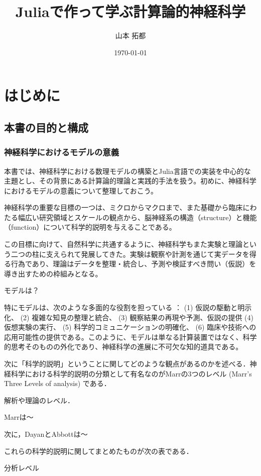 \documentclass[titlepage]{ltjsbook}
\title{\Huge \textbf{Juliaで作って学ぶ計算論的神経科学}}
\author{\huge 山本 拓都}
\date{\huge \today}
\begin{document}
\setcounter{tocdepth}{2}
\tableofcontents
\clearpage
\chapter{はじめに}
\section{本書の目的と構成}
\subsection{神経科学におけるモデルの意義}
本書では、神経科学における数理モデルの構築とJulia言語での実装を中心的な主題とし、その背景にある計算論的理論と実践的手法を扱う。初めに、神経科学におけるモデルの意義について整理しておこう。

神経科学の重要な目標の一つは、ミクロからマクロまで、また基礎から臨床にわたる幅広い研究領域とスケールの観点から、脳神経系の構造（structure）と機能（function）について科学的説明を与えることである。

この目標に向けて、自然科学に共通するように、神経科学もまた実験と理論という二つの柱に支えられて発展してきた。実験は観察や計測を通じて実データを得る行為であり、理論はデータを整理・統合し、予測や検証すべき問い（仮説）を導き出すための枠組みとなる。

モデルは？

特にモデルは、次のような多面的な役割を担っている \citep{Blohm2020-vc,levenstein2023role,van2024critical}：
 (1) 仮説の駆動と明示化、 (2) 複雑な知見の整理と統合、 (3) 観察結果の再現や予測、仮説の提供 (4) 仮想実験の実行、 (5) 科学的コミュニケーションの明確化、 (6) 臨床や技術への応用可能性の提供である。このように、モデルは単なる計算装置ではなく、科学的思考そのものの外化であり、神経科学の進展に不可欠な知的道具である。

次に「科学的説明」ということに関してどのような観点があるのかを述べる．神経科学における科学的説明の分類として有名なのがMarrの3つのレベル (Marr's Three Levels of analysis) \citep{Marr1982-wk} である．

解析や理論のレベル．

Marrは～

次に，DayanとAbbottは～

これらの科学的説明に関してまとめたものが次の表である．

分析レベル
\end{document}
